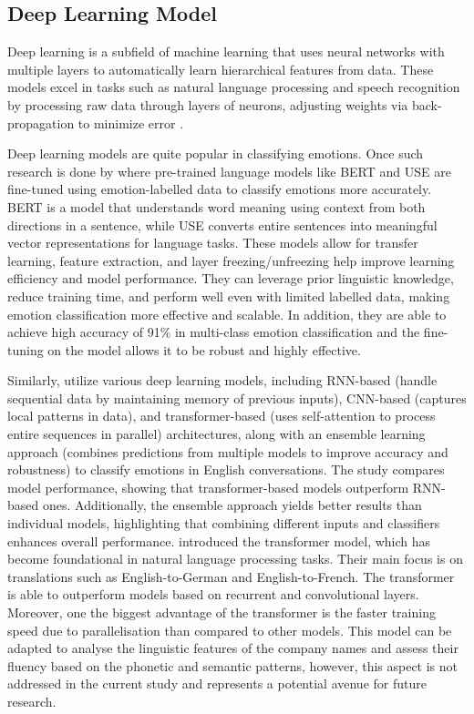 \documentclass[a4paper,11pt]{report}
\begin{document}
\subsection{Deep Learning Model}
Deep learning is a subfield of machine learning that uses neural networks with multiple layers to automatically learn hierarchical features from data. These models excel in tasks such as natural language processing and speech recognition by processing raw data through layers of neurons, adjusting weights via back-propagation to minimize error \cite{dl, dl1}.

Deep learning models are quite popular in classifying emotions. Once such research is done by  where pre-trained language models like BERT and USE are fine-tuned using emotion-labelled data to classify emotions more accurately. BERT is a model that understands word meaning using context from both directions in a sentence, while USE converts entire sentences into meaningful vector representations for language tasks. These models allow for transfer learning, feature extraction, and layer freezing/unfreezing help improve learning efficiency and model performance. They can leverage prior linguistic knowledge, reduce training time, and perform well even with limited labelled data, making emotion classification more effective and scalable. In addition, they are able to achieve high accuracy of 91\% in multi-class emotion classification and the fine-tuning on the model allows it to be robust and highly effective. 

Similarly,  utilize various deep learning models, including RNN-based (handle sequential data by maintaining memory of previous inputs), CNN-based (captures local patterns in data), and transformer-based (uses self-attention to process entire sequences in parallel) architectures, along with an ensemble learning approach (combines predictions from multiple models to improve accuracy and robustness) to classify emotions in English conversations. The study compares model performance, showing that transformer-based models outperform RNN-based ones. Additionally, the ensemble approach yields better results than individual models, highlighting that combining different inputs and classifiers enhances overall performance.  introduced the transformer model, which has become foundational in natural language processing tasks. Their main focus is on translations such as English-to-German and English-to-French. The transformer is able to outperform models based on recurrent and convolutional layers. Moreover, one the biggest advantage of the transformer is the faster training speed due to parallelisation than compared to other models. This model can be adapted to analyse the linguistic features of the company names and assess their fluency based on the phonetic and semantic patterns, however, this aspect is not addressed in the current study and represents a potential avenue for future research.
\end{document}
